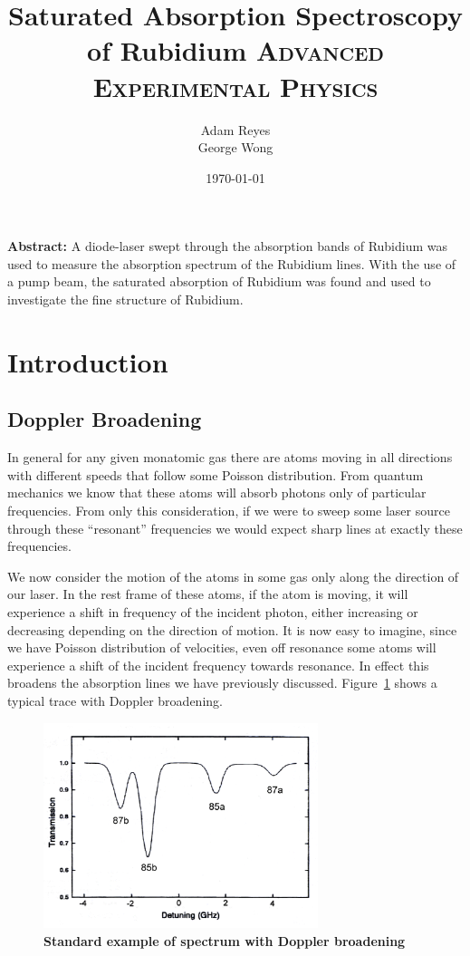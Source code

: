 \documentclass[paper=a4, fontsize=11pt]{scrartcl} %
\title{	
Saturated Absorption Spectroscopy of Rubidium
\horrule{0.5pt}
\normalfont \normalsize 
\textsc{Advanced Experimental Physics }
}
\author{Adam Reyes \\ George Wong} %
\date{\normalsize\today} %
\numberwithin{equation}{section}
\numberwithin{figure}{section}
\numberwithin{table}{section}
\begin{document}
\maketitle



\textbf{Abstract:}
A diode-laser swept through the absorption bands of Rubidium was used
to measure the absorption spectrum of the Rubidium lines. With the use
of a pump beam, the saturated absorption of Rubidium was found and
used to investigate the fine structure of Rubidium. 

\section{Introduction}

\subsection{Doppler Broadening}

In general for any given monatomic gas there are atoms moving in all
directions with different speeds that follow some Poisson
distribution. From quantum mechanics we know that these atoms will
absorb photons only of particular frequencies. From only this
consideration, if we were to sweep some laser source through
these ``resonant'' frequencies we would expect sharp lines at
exactly these frequencies. 

We now consider the motion of the atoms
in some gas only along the direction of our laser. In the rest frame
of these atoms, if the atom is moving, it will experience a shift in
frequency of the incident photon, either increasing or decreasing
depending on the direction of motion. It is now easy to imagine, since we have
Poisson distribution of velocities, even off resonance some atoms will
experience a shift of the incident frequency towards resonance. In
effect this broadens the absorption lines we have previously
discussed. Figure~\ref{fig:broadening} shows a typical trace with Doppler broadening.

\begin{figure}[H] \begin{center}
  \includegraphics[height=60mm]{broadening.png}
  \caption{\textbf{Standard example of spectrum with Doppler broadening}}
  \label{fig:broadening}
\end{center} \end{figure}
\end{document}
